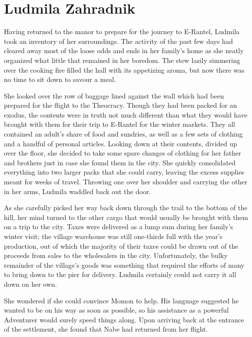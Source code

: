 \chapter{Ludmila Zahradnik}
Having returned to the manor to prepare for the journey to E-Rantel, Ludmila took an inventory of her surroundings. The activity of the past few days had cleared away most of the loose odds and ends in her family’s home as she neatly organized what little that remained in her boredom. The stew lazily simmering over the cooking fire filled the hall with its appetizing aroma, but now there was no time to sit down to savour a meal.

 

She looked over the row of baggage lined against the wall which had been prepared for the flight to the Theocracy. Though they had been packed for an exodus, the contents were in truth not much different than what they would have brought with them for their trip to E-Rantel for the winter markets. They all contained an adult’s share of food and sundries, as well as a few sets of clothing and a handful of personal articles. Looking down at their contents, divided up over the floor, she decided to take some spare changes of clothing for her father and brothers just in case she found them in the city. She quickly consolidated everything into two larger packs that she could carry, leaving the excess supplies meant for weeks of travel. Throwing one over her shoulder and carrying the other in her arms, Ludmila waddled back out the door.

 

As she carefully picked her way back down through the trail to the bottom of the hill, her mind turned to the other cargo that would usually be brought with them on a trip to the city. Taxes were delivered as a lump sum during her family’s winter visit; the village warehouse was still one-thirds full with the year’s production, out of which the majority of their taxes could be drawn out of the proceeds from sales to the wholesalers in the city. Unfortunately, the bulky remainder of the village’s goods was something that required the efforts of many to bring down to the pier for delivery. Ludmila certainly could not carry it all down on her own.

 

She wondered if she could convince Momon to help. His language suggested he wanted to be on his way as soon as possible, so his assistance as a powerful Adventurer would surely speed things along. Upon arriving back at the entrance of the settlement, she found that Nabe had returned from her flight.

